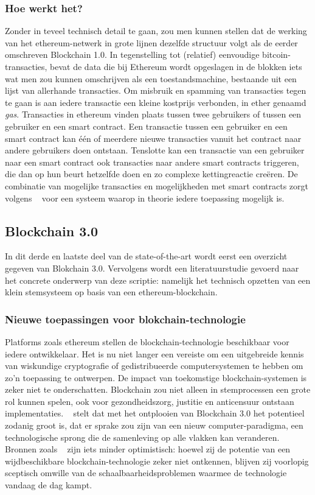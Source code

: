 \subsubsection*{Hoe werkt het?}
Zonder in teveel technisch detail te gaan, zou men kunnen stellen dat de werking van het ethereum-netwerk in grote lijnen dezelfde structuur volgt als de eerder omschreven Blockchain 1.0. In tegenstelling tot (relatief) eenvoudige bitcoin-transacties, bevat de data die bij Ethereum wordt opgeslagen in de blokken iets wat men zou kunnen omschrijven als een toestandsmachine, bestaande uit een lijst van allerhande transacties. Om misbruik en spamming van transacties tegen te gaan is aan iedere transactie een kleine kostprijs verbonden, in ether genaamd  \emph{gas}. Transacties in ethereum vinden plaats tussen twee gebruikers of tussen een gebruiker en een smart contract. Een transactie tussen een gebruiker en een smart contract kan één of meerdere nieuwe transacties vanuit het contract naar andere gebruikers doen ontstaan. Tenslotte kan een transactie van een gebruiker naar een smart contract ook transacties naar andere smart contracts triggeren, die dan op hun beurt hetzelfde doen en zo complexe kettingreactie creëren. De combinatie van mogelijke transacties en mogelijkheden met smart contracts zorgt volgens ~\textcite{Wood2017} voor een systeem waarop in theorie iedere toepassing mogelijk is. 
\subsection*{Blockchain 3.0}
\label{sec:wat-is-blockchain}

In dit derde en laatste deel van de state-of-the-art wordt eerst een overzicht gegeven van Blokchain 3.0. Vervolgens wordt een literatuurstudie gevoerd naar het concrete onderwerp van deze scriptie: namelijk het technisch opzetten van een klein stemsysteem op basis van een ethereum-blockchain.

\subsubsection*{Nieuwe toepassingen voor blokchain-technologie}

Platforms zoals ethereum  stellen de blockchain-technologie beschikbaar voor iedere ontwikkelaar. Het is nu niet langer een vereiste om een uitgebreide kennis van wiskundige cryptografie of gedistribueerde computersystemen te hebben om zo'n toepassing te ontwerpen. De impact van toekomstige blockchain-systemen is zeker niet te onderschatten. Blockchain zou niet alleen in stemprocessen een grote rol kunnen spelen, ook voor gezondheidszorg, justitie en anticensuur ontstaan implementaties. ~\textcite{Swan2015} stelt dat met het ontplooien van Blockchain 3.0 het potentieel zodanig groot is, dat er sprake zou zijn van een nieuw computer-paradigma, een technologische sprong die de samenleving op alle vlakken kan veranderen. Bronnen zoals ~\textcite{Wood2017} zijn iets minder optimistisch: hoewel zij de potentie van een wijdbeschikbare blockchain-technologie zeker niet ontkennen, blijven zij voorlopig sceptisch omwille van de schaalbaarheidsproblemen waarmee de technologie vandaag de dag kampt.

